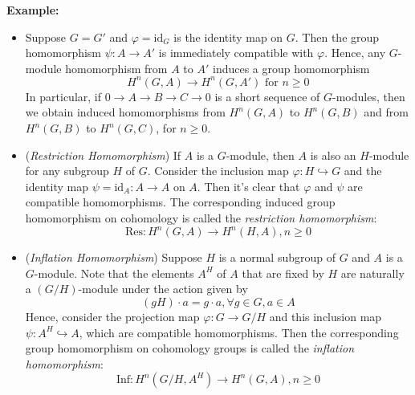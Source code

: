 \noindent\textbf{Example:} \begin{itemize}
    \item Suppose $G=G'$ and $\varphi=\text{id}_G$ is the identity map on $G$. Then the group homomorphism $\psi:A\to A'$ is immediately compatible with $\varphi$. Hence, any $G$-module homomorphism from $A$ to $A'$ induces a group homomorphism
    \[
    H^n(G,A)\to H^n(G,A') \text{ for }n\geq 0
    \]
    In particular, if $0\to A\to B\to C\to0$ is a short sequence of $G$-modules, then we obtain induced homomorphisms from $H^n(G,A)$ to $H^n(G,B)$ and from $H^n(G,B)$ to $H^n(G,C)$, for $n\geq0$.

    \item (\textit{Restriction Homomorphism}) If $A$ is a $G$-module, then $A$ is also an $H$-module for any subgroup $H$ of $G$. Consider the inclusion map $\varphi:H \hookrightarrow G$ and the identity map $\psi=\text{id}_A:A\to A$ on $A$. Then it's clear that $\varphi$ and $\psi$ are compatible homomorphisms. The corresponding induced group homomorphism on cohomology is called the \textit{restriction homomorphism}:
    \[
    \text{Res}: H^n(G,A) \to H^n(H,A),n\geq 0
    \]

    \item (\textit{Inflation Homomorphism}) Suppose $H$ is a normal subgroup of $G$ and $A$ is a $G$-module. Note that the elements $A^H$ of $A$ that are fixed by $H$ are naturally a $(G/H)$-module under the action given by
    \[
    (gH) \cdot a=g\cdot a ,\forall g\in G,a\in A
    \]
    Hence, consider the projection map $\varphi:G\to G/H$ and this inclusion map $\psi:A^H \hookrightarrow A$, which are compatible homomorphisms. Then the corresponding group homomorphism on cohomology groups is called the \textit{inflation homomorphism}:
    \[
    \text{Inf}:H^n (G/H,A^H) \to H^n(G,A),n\geq0
    \]


\end{itemize}
